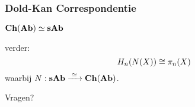 \documentclass[14pt]{beamer}
\begin{document}
\begin{frame}
	\frametitle{Dold-Kan Correspondentie}
	\begin{center}
	{\Large $ \mathbf{Ch}(\mathbf{Ab}) \simeq \mathbf{sAb} $}

	verder:
	{\Large $$ H_n(N(X)) \cong \pi_n(X) $$}
	waarbij $N : \mathbf{sAb} \xrightarrow{\,\,{\simeq}\,\,} \mathbf{Ch}(\mathbf{Ab})$.
	\end{center}
\end{frame}


\begin{frame}
	\begin{center}
	\Huge Vragen?
	\end{center}
\end{frame}
\end{document}
